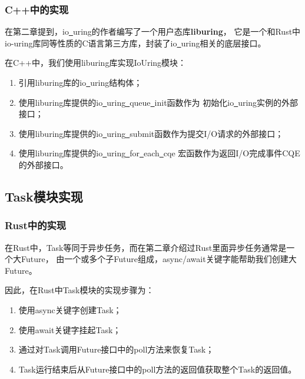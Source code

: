 \documentclass[supercite]{HustGraduPaper}
\theoremstyle{definition}
\begin{document}
\subsubsection{C++中的实现}

在第二章提到，io\underline{~}uring的作者编写了一个用户态库\textbf{liburing}，
它是一个和Rust中io-uring库同等性质的C语言第三方库，封装了io\underline{~}uring相关的底层接口。\par

在C++中，我们使用liburing库实现IoUring模块：

\begin{enumerate}
  \item 引用liburing库的io\underline{~}uring结构体；
  \item 使用liburing库提供的io\underline{~}uring\underline{~}queue\underline{~}init函数作为
    初始化io\underline{~}uring实例的外部接口；
  \item 使用liburing库提供的io\underline{~}uring\underline{~}submit函数作为提交I/O请求的外部接口；
  \item 使用liburing库提供的io\underline{~}uring\underline{~}for\underline{~}each\underline{~}cqe
    宏函数作为返回I/O完成事件CQE的外部接口。
\end{enumerate}

\subsection{Task模块实现}

\subsubsection{Rust中的实现}

在Rust中，Task等同于异步任务，而在第二章介绍过Rust里面异步任务通常是一个大Future，
由一个或多个子Future组成，async/await关键字能帮助我们创建大Future。\par

因此，在Rust中Task模块的实现步骤为：

\begin{enumerate}
  \item 使用async关键字创建Task；
  \item 使用await关键字挂起Task；
  \item 通过对Task调用Future接口中的poll方法来恢复Task；
  \item Task运行结束后从Future接口中的poll方法的返回值获取整个Task的返回值。
\end{enumerate}
\end{document}
